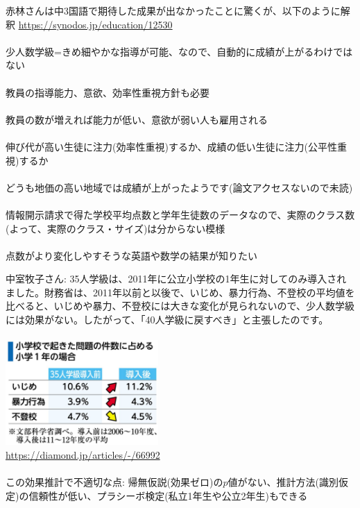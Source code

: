 \begin{frame}{}
赤林さんは中3国語で期待した成果が出なかったことに驚くが、以下のように解釈 {\footnotesize \url{https://synodos.jp/education/12530}}\\~\\
\pause
少人数学級=きめ細やかな指導が可能、なので、自動的に成績が上がるわけではない\\~\\
\pause
教員の指導能力、意欲、効率性重視方針も必要\\~\\
\pause
教員の数が増えれば能力が低い、意欲が弱い人も雇用される\\~\\
\pause
伸び代が高い生徒に注力(効率性重視)するか、成績の低い生徒に注力(公平性重視)するか\\~\\
\pause
どうも地価の高い地域では成績が上がったようです(論文アクセスないので未読)\\~\\
\pause
情報開示請求で得た学校平均点数と学年生徒数のデータなので、実際のクラス数(よって、実際のクラス・サイズ)は分からない模様\\~\\
\pause
点数がより変化しやすそうな英語や数学の結果が知りたい
\end{frame}

\begin{frame}{}
中室牧子さん: 35人学級は、2011年に公立小学校の1年生に対してのみ導入されました。財務省は、2011年以前と以後で、いじめ、暴力行為、不登校の平均値を比べると、いじめや暴力、不登校には大きな変化が見られないので、少人数学級には効果がない。したがって、「40人学級に戻すべき」と主張したのです。\\~\\
\hfil\includegraphics[height = 4cm]{ImpactEvaluation/figure/35ninGakkyu_DiamondOnline.jpg}\\
\url{https://diamond.jp/articles/-/66992}\\~\\

\pause
この効果推計で不適切な点: 帰無仮説(効果ゼロ)の$p$値がない、推計方法(識別仮定)の信頼性が低い、プラシーボ検定(私立1年生や公立2年生)もできる
\end{frame}

